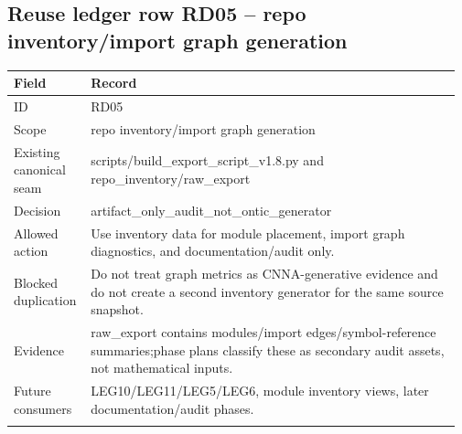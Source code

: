 \subsection*{Reuse ledger row RD05 -- repo inventory/\allowbreak{}import graph generation}
\begin{longtable}{L{0.16\linewidth} L{0.81\linewidth}}
\hline
\textbf{Field} & \textbf{Record}\\
\hline
ID & RD05\\
\hline\addlinespace[0.20em]
Scope & repo inventory/\allowbreak{}import graph generation\\
\hline\addlinespace[0.20em]
Existing canonical seam & scripts/\allowbreak{}build\_export\_script\_v1.8.py and repo\_inventory/\allowbreak{}raw\_export\\
\hline\addlinespace[0.20em]
Decision & artifact\_only\_audit\_not\_ontic\_generator\\
\hline\addlinespace[0.20em]
Allowed action & Use inventory data for module placement, import graph diagnostics, and documentation/\allowbreak{}audit only.\\
\hline\addlinespace[0.20em]
Blocked duplication & Do not treat graph metrics as CNNA-generative evidence and do not create a second inventory generator for the same source snapshot.\\
\hline\addlinespace[0.20em]
Evidence & raw\_export contains modules/\allowbreak{}import edges/\allowbreak{}symbol-reference summaries;\newline phase plans classify these as secondary audit assets, not mathematical inputs.\\
\hline\addlinespace[0.20em]
Future consumers & LEG10/\allowbreak{}LEG11/\allowbreak{}LEG5/\allowbreak{}LEG6, module inventory views, later documentation/\allowbreak{}audit phases.\\
\hline\addlinespace[0.20em]
\end{longtable}

